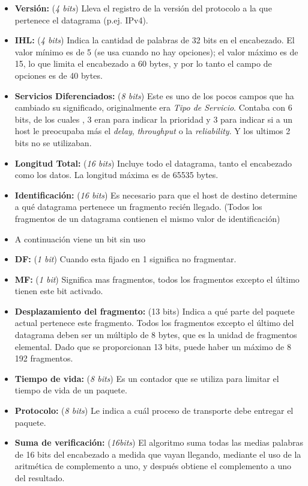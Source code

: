 \documentclass[10pt,a4paper]{report}
\begin{document}
	\begin{itemize}
		\item \textbf{Versión:} (\textit{4 bits}) Lleva el registro de la versión del protocolo a la que pertenece el datagrama (p.ej. IPv4).
		\item \textbf{IHL:} (\textit{4 bits}) Indica la cantidad de palabras de 32 bits en el encabezado. El valor mínimo es de 5 (se usa cuando no hay opciones); el valor
máximo es de 15, lo que limita el encabezado a 60 bytes, y por lo tanto el campo de opciones es de 40 bytes.
		\item \textbf{Servicios Diferenciados:} (\textit{8 bits}) Este es uno de los pocos campos que ha cambiado su significado, originalmente era \textit{Tipo de Servicio}. Contaba con 6 bits, de los cuales , 3 eran para indicar la prioridad y 3 para indicar si a un host le
preocupaba más el \textit{delay}, \textit{throughput} o la \textit{reliability}. Y los ultimos 2 bits no se utilizaban.
		\item \textbf{Longitud Total:} (\textit{16 bits}) Incluye todo el datagrama, tanto el encabezado como los datos. La longitud máxima es de 65535 bytes.
		\item \textbf{Identificación:} (\textit{16 bits}) Es necesario para que el host de destino determine a qué datagrama pertenece un
fragmento recién llegado. (Todos los fragmentos de un datagrama contienen el mismo valor de identificación)
		\item A continuación viene un bit sin uso
		\item \textbf{DF:} (\textit{1 bit}) Cuando esta fijado en 1 significa no fragmentar.
		\item \textbf{MF:} (\textit{1 bit}) Significa mas fragmentos, todos los fragmentos excepto el último tienen este bit activado.
		\item \textbf{Desplazamiento del fragmento:} (13 bits) Indica a qué parte del paquete actual pertenece este fragmento. Todos los fragmentos excepto el último del datagrama deben ser un múltiplo de 8 bytes, que es la unidad de fragmentos elemental. Dado que se proporcionan 13 bits, puede haber un máximo de 8 192 fragmentos.
		\item \textbf{Tiempo de vida:} (\textit{8 bits}) Es un contador que se utiliza para limitar el tiempo de vida de un paquete.
		\item \textbf{Protocolo:} (\textit{8 bits}) Le indica a cuál proceso de transporte debe entregar el paquete.
		\item \textbf{Suma de verificación:} (\textit{16bits}) El algoritmo suma todas las medias palabras de 16 bits del encabezado a medida que vayan llegando, mediante el uso de la aritmética de complemento a uno, y después obtiene el complemento a uno del resultado.

\end{itemize}
\end{document}
